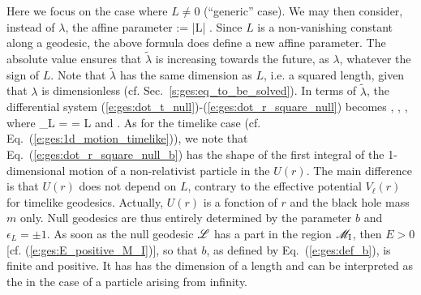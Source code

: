 Here we focus on the case where $L\not= 0$ (``generic'' case). We may then
consider, instead of $\lambda$, the affine parameter
\be
    \tilde{\lambda} := |L| \lambda .
\ee
Since $L$ is a non-vanishing constant along a geodesic, the above formula
does define a new affine parameter. The absolute value ensures that
$\tilde{\lambda}$ is increasing towards the future, as $\lambda$, whatever
the sign of $L$. Note that $\tilde{\lambda}$ has the same
dimension as $L$, i.e. a squared length, given that $\lambda$ is dimensionless
(cf. Sec.~\ref{s:ges:eq_to_be_solved}).
In terms of $\tilde{\lambda}$,
the differential system (\ref{e:ges:dot_t_null})-(\ref{e:ges:dot_r_square_null})
becomes
\be \label{e:ges:dot_t_null_b}
   ,
\ee
\be \label{e:ges:dot_ph_null_b}
    ,
\ee
\be \label{e:ges:dot_r_square_null_b}
   ,
\ee
where
\be \label{e:ges:def_b}
\ee
\be
    \epsilon_L =  =  L
\ee
and
\be \label{e:ges:eff_pot_null}
    .
\ee
As for the timelike case (cf. Eq.~(\ref{e:ges:1d_motion_timelike})),
we note that Eq.~(\ref{e:ges:dot_r_square_null_b})
has the shape of the first integral of the
1-dimensional motion of a non-relativist particle in the
$U(r)$. The main difference is that $U(r)$ does not depend on $L$, contrary
to the effective potential $V_\ell(r)$ for timelike geodesics. Actually,
$U(r)$ is a fonction of $r$ and the black hole mass $m$ only.
Null geodesics are thus entirely determined by the parameter
$b$ and $\epsilon_L = \pm 1$.
As soon as the null geodesic $\mathscr{L}$ has a part in the
region $\mathscr{M}_{\rm I}$, then $E>0$ [cf. (\ref{e:ges:E_positive_M_I})], so that
$b$, as defined by Eq.~(\ref{e:ges:def_b}), is finite and positive. It has
has the dimension of a length
and can be interpreted as the
 in the case of a
particle arising from infinity.
